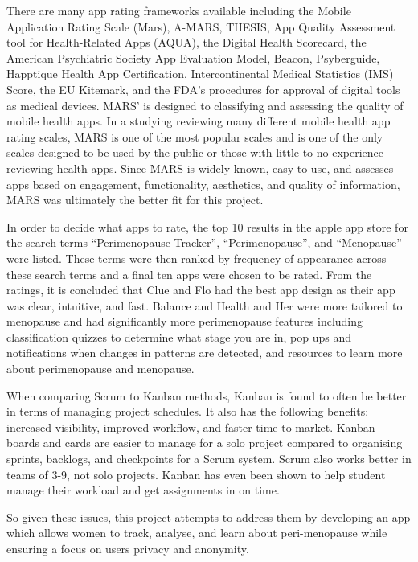 There are many app rating frameworks available including the Mobile Application Rating Scale (Mars), A-MARS, THESIS, App Quality Assessment tool for Health-Related Apps (AQUA), the Digital Health Scorecard, the American Psychiatric Society App Evaluation Model, Beacon, Psyberguide, Happtique Health App Certification, Intercontinental Medical Statistics (IMS) Score, the EU Kitemark, and the FDA’s procedures for approval of digital tools as medical devices\cite{Morley2024}. MARS’ is designed to classifying and assessing the quality of mobile health apps\cite{Stoyanov2015}. In a studying reviewing many different mobile health app rating scales, MARS is one of the most popular scales and is one of the only scales designed to be used by the public or those with little to no experience reviewing health apps\cite{AzadKhaneghah2020}. Since MARS is widely known, easy to use, and assesses apps based on engagement, functionality, aesthetics, and quality of information, MARS was ultimately the better fit for this project.

In order to decide what apps to rate, the top 10 results in the apple app store for the search terms “Perimenopause Tracker”, “Perimenopause”, and “Menopause” were listed. These terms were then ranked by frequency of appearance across these search terms and a final ten apps were chosen to be rated. From the ratings, it is concluded that Clue and Flo had the best app design as their app was clear, intuitive, and fast. Balance and Health and Her were more tailored to menopause and had significantly more perimenopause features including classification quizzes to determine what stage you are in, pop ups and notifications when changes in patterns are detected, and resources to learn more about perimenopause and menopause. 

When comparing Scrum to Kanban methods, Kanban is found to often be better in terms of managing project schedules\cite{Lei2017}. It also has the following benefits: increased visibility,  improved workflow, and faster time to market\cite{Ahmad2018}. Kanban boards and cards are easier to manage for a solo project compared to organising sprints, backlogs, and checkpoints for a Scrum system. Scrum also works better in teams of 3-9, not solo projects\cite{Mundra2013Practical}. Kanban has even been shown to help student manage their workload and get assignments in on time\cite{Sheng2021Kanban}. 

So given these issues, this project attempts to address them by developing an app which allows women to track, analyse, and learn about peri-menopause while ensuring a focus on users privacy and anonymity. 
